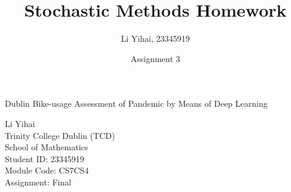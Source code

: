 \documentclass[a4paper,11pt]{report}
\title{Stochastic Methods Homework}
\author{Li Yihai, 23345919}
\date{Assignment 3}
\begin{document}
% 
{
  \begin{center}
    \Huge Dublin Bike-usage Assessment of Pandemic by Means of Deep Learning
  \end{center}
}
\vspace*{1em}
\begin{multicols}{2}
  \begin{center}
    Li Yihai \\
    Trinity College Dublin (TCD)\\
    School of Mathematics\\
    Student ID: 23345919 \\
    Module Code: CS7CS4 \\
    Assignment: Final
  \end{center}
\end{multicols}
\vspace*{2em}

\begin{multicols}{2}





\end{multicols}
{
  \small


}

\end{document}
